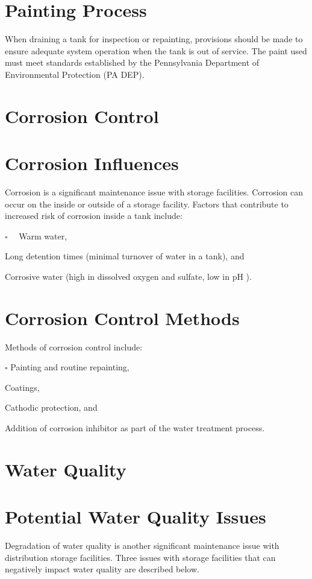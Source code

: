 \documentclass[10pt]{article}
\begin{document}
\section{Painting Process}
When draining a tank for inspection or repainting, provisions should be made to ensure adequate system operation when the tank is out of service. The paint used must meet standards established by the Pennsylvania Department of Environmental Protection (PA DEP).

\section{Corrosion Control}
\section{Corrosion Influences}
Corrosion is a significant maintenance issue with storage facilities. Corrosion can occur on the inside or outside of a storage facility. Factors that contribute to increased risk of corrosion inside a tank include:

$\square \quad$ Warm water,

Long detention times (minimal turnover of water in a tank), and

Corrosive water (high in dissolved oxygen and sulfate, low in $\mathrm{pH}$ ).

\section{Corrosion Control Methods}
Methods of corrosion control include:

$\square$ Painting and routine repainting,

Coatings,

Cathodic protection, and

Addition of corrosion inhibitor as part of the water treatment process.

\section{Water Quality}
\section{Potential Water Quality Issues}
Degradation of water quality is another significant maintenance issue with distribution storage facilities. Three issues with storage facilities that can negatively impact water quality are described below.
\end{document}
